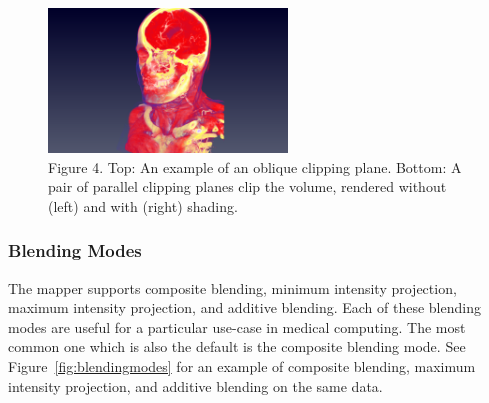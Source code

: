 \begin{figure}
\centering
\includegraphics[width=2.5in]{HeadClippingOblique.png}
\caption{Figure 4. Top: An example of an oblique clipping plane. Bottom: A pair of parallel clipping planes clip the volume, rendered without (left) and with (right) shading.}
\label{fig:clipping}
\end{figure}

\subsubsection{Blending Modes}
The mapper supports composite blending, minimum intensity projection, maximum intensity projection, and additive blending. Each of these blending modes are useful for a particular use-case in medical computing. The most common one which is also the default is the composite blending mode. See Figure~\ref{fig:blendingmodes} for an example of composite blending, maximum intensity projection, and additive blending on the same data.

